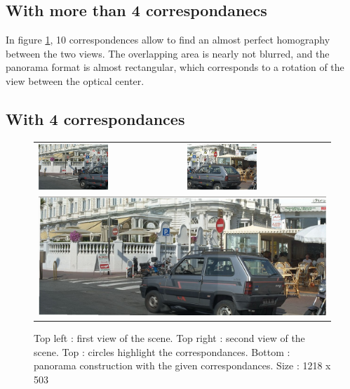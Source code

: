 \documentclass[12pt,a4paper,onecolumn]{article}
\begin{document}
\subsection{With more than 4 correspondanecs}

In figure \ref{many_corr}, 10 correspondences allow to find an almost perfect homography between the two views. The overlapping area is nearly not blurred, and the panorama format is almost rectangular, which corresponds to a rotation of the view between the optical center.

\subsection{With 4 correspondances}
\begin{figure}[H]
\begin{center}
\begin{tabular}{p{}  p{}}
\includegraphics[width = 0.5\textwidth]{I1_3.png} &
\includegraphics[width = 0.5\textwidth]{I2_3.png} \\
\multicolumn{2}{c}{\includegraphics[width = 1.0\textwidth]{Panorama_3.png}}
\end{tabular}
\end{center}
\caption{Top left : first view of the scene. Top right : second view of the scene. Top : circles highlight the correspondances. Bottom : panorama construction with the given correspondances. Size : 1218 x 503}
\label{many_corr}
\end{figure}
\end{document}
